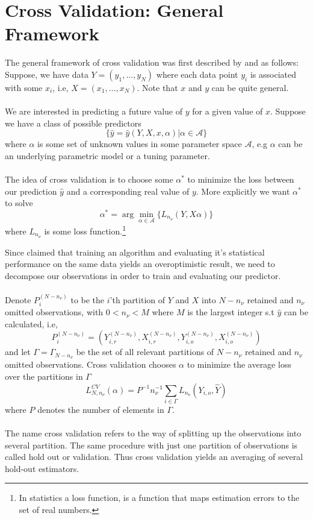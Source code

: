 \documentclass[Research_Module_ES.tex]{subfiles}
\begin{document}
\section{Cross Validation: General Framework}
The general framework of cross validation was first described by \cite{stone1974cross} and  \cite{geisser1975predictive} as follows: \\

Suppose, we have data $Y=(y_1,\ldots,y_N)$ where each data point $y_i$ is associated with some $x_i$, i.e, $X=(x_1,\ldots,x_N)$. Note that $x$ and $y$ can be quite general.\\
\\
We are interested in predicting a future value of $y$ for a given value of $x$. Suppose we have a class of possible predictors 
\[
	\{\hat{y}=\hat{y}(Y,X,x,\alpha)|\alpha\in\mathscr{A}\}
\]
where $\alpha$ is some set of unknown values in some parameter space $\mathscr{A}$, e.g $\alpha$ can be an underlying parametric model or a tuning parameter.\\
\\
The idea of cross validation is to choose some $\alpha^\ast$ to minimize the loss between our prediction $\hat{y}$ and a corresponding real value of $y$. More explicitly we want $\alpha^\ast$ to solve
\[
	\alpha^\ast=\arg\min_{\alpha\in\mathscr{A}}\{L_{n_\nu}(Y,X\alpha)\}
\]
where $L_{n_\nu}$ is some loss function.\footnote{In statistics a loss function, is a function that maps estimation errors to the set of real numbers.  }
 
Since \cite{larson1931shrinkage} claimed that training an algorithm and evaluating it's statistical performance on the same data yields an overoptimistic result, we need to decompose our observations in order to train and evaluating our predictor. \\
\\
Denote $P^{(N-n_\nu)}_i$ to be the $i$'th partition of $Y$ and $X$ into $N-n_\nu$ retained and $n_\nu$ omitted observations, with $0<n_\nu<M$ where $M$ is the largest integer s.t $\hat{y}$ can be calculated, i.e,
\[
	P^{(N-n_\nu)}_i=(Y_{i,r}^{(N-n_\nu)},X_{i,r}^{(N-n_\nu)},Y_{i,o}^{(N-n_\nu)},X_{i,o}^{(N-n_\nu)})
\]
and let $\Gamma=\Gamma_{N-n_\nu}$ be the set of all relevant partitions of $N-n_\nu$ retained and $n_\nu$ omitted observations. Cross validation chooses $\alpha$ to minimize the average loss over the partitions in $\Gamma$ 
\[
	L_{N,n_\nu}^{CV}(\alpha)=P^{-1}n_\nu^{-1}\sum_{i\in\Gamma}L_{n_\nu}(Y_{i,o},\hat{Y})
\]
where $P$ denotes the number of elements in $\Gamma$.\\
\\
The name cross validation refers to the way of splitting up the observations into several partition. The same procedure with just one partition of observations is called hold out or validation. Thus cross validation yields an averaging of several hold-out estimators.
\end{document}
